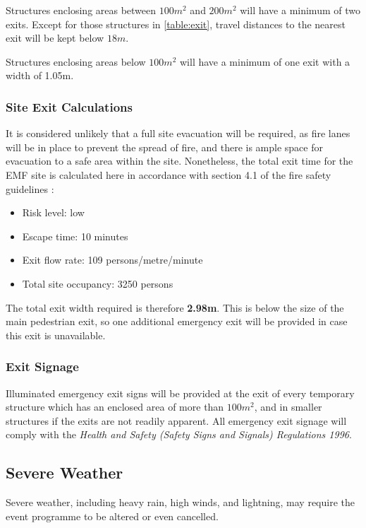 Structures enclosing areas between $100m^2$ and $200m^2$ will have a minimum of two exits. Except
for those structures in \cref{table:exit}, travel distances to the nearest exit will be kept below $18m$.

Structures enclosing areas below $100m^2$ will have a minimum of one exit with a width of 1.05m.

\subsubsection{Site Exit Calculations}
It is considered unlikely that a full site evacuation will be required, as fire lanes will be in place to
prevent the spread of fire, and there is ample space for evacuation to a safe area within the site.
Nonetheless, the total exit time for the EMF site is calculated here in accordance with section 4.1 of the
fire safety guidelines \cite{firesafety}:

\begin{itemize}
    \tightlist
    \item Risk level: low
    \item Escape time: 10 minutes
    \item Exit flow rate: 109 persons/metre/minute
    \item Total site occupancy: 3250 persons
\end{itemize}

The total exit width required is therefore \textbf{2.98m}. This is below the size of the
main pedestrian exit, so one additional emergency exit will be provided in case this exit
is unavailable.

\subsubsection{Exit Signage}

Illuminated emergency exit signs will be provided at the exit of every temporary structure which
has an enclosed area of more than $100m^2$, and in smaller structures if the exits are not
readily apparent. All emergency exit
signage will comply with the \textit{Health and Safety (Safety Signs and Signals) Regulations 1996}.

\subsection{Severe Weather}
\label{severe-weather}
Severe weather, including heavy rain, high winds, and lightning, may require the event
programme to be altered or even cancelled.

